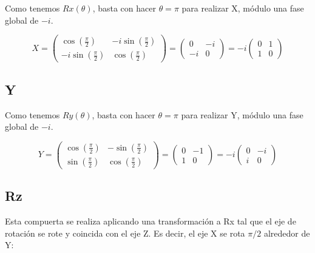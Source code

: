 Como tenemos $Rx(\theta)$, basta con hacer $\theta = \pi$ para realizar X, módulo una fase global de $-i$.

\begin{equation}
    X = 
    \begin{pmatrix}
        \cos(\frac{\pi}{2}) & -i \sin(\frac{\pi}{2}) \\
        -i \sin(\frac{\pi}{2}) & \cos(\frac{\pi}{2})
    \end{pmatrix} =
    \begin{pmatrix}
        0 & -i \\
        -i & 0
    \end{pmatrix} = 
    -i \begin{pmatrix}
        0 & 1 \\
        1 & 0
    \end{pmatrix}
\end{equation}

\subsection{Y}

Como tenemos $Ry(\theta)$, basta con hacer $\theta = \pi$ para realizar Y, módulo una fase global de $-i$.

\begin{equation}
    Y = 
    \begin{pmatrix}
        \cos(\frac{\pi}{2}) & -\sin(\frac{\pi}{2}) \\
        \sin(\frac{\pi}{2}) & \cos(\frac{\pi}{2})
    \end{pmatrix} =
    \begin{pmatrix}
        0 & -1 \\
        1 & 0
    \end{pmatrix} = 
    -i \begin{pmatrix}
        0 & -i \\
        i & 0
    \end{pmatrix}
\end{equation}

\subsection{Rz}

Esta compuerta se realiza aplicando una transformación a Rx tal que el eje de rotación se rote y coincida con el eje Z. Es decir, el eje X se rota $\pi/2$ alrededor de Y:

